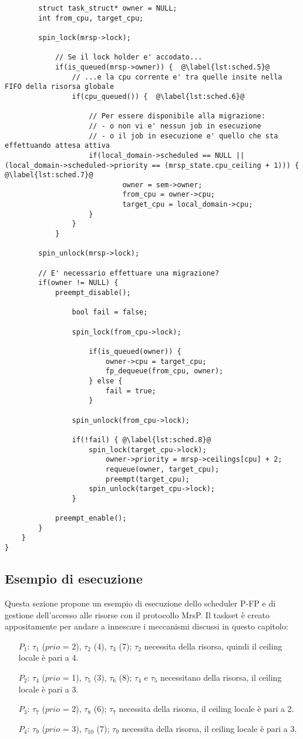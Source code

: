 \begin{lstlisting}
		struct task_struct* owner = NULL;
		int from_cpu, target_cpu;

		spin_lock(mrsp->lock);

			// Se il lock holder e' accodato...
			if(is_queued(mrsp->owner)) {  @\label{lst:sched.5}@
				// ...e la cpu corrente e' tra quelle insite nella FIFO della risorsa globale
				if(cpu_queued()) {  @\label{lst:sched.6}@

					// Per essere disponibile alla migrazione:
					// - o non vi e' nessun job in esecuzione
					// - o il job in esecuzione e' quello che sta effettuando attesa attiva
					if(local_domain->scheduled == NULL || (local_domain->scheduled->priority == (mrsp_state.cpu_ceiling + 1))) {  @\label{lst:sched.7}@
							owner = sem->owner;
							from_cpu = owner->cpu;
							target_cpu = local_domain->cpu;
					}
				} 
			}

		spin_unlock(mrsp->lock);

		// E' necessario effettuare una migrazione?
		if(owner != NULL) {
			preempt_disable();

				bool fail = false;

				spin_lock(from_cpu->lock);
				
					if(is_queued(owner)) {
						owner->cpu = target_cpu;
						fp_dequeue(from_cpu, owner);
					} else {
						fail = true;
					}
				
				spin_unlock(from_cpu->lock);

				if(!fail) { @\label{lst:sched.8}@
					spin_lock(target_cpu->lock);
						owner->priority = mrsp->ceilings[cpu] + 2;
						requeue(owner, target_cpu);
						preempt(target_cpu);
					spin_unlock(target_cpu->lock);
				}

			preempt_enable();
		}
	}
}
\end{lstlisting}

\subsection{Esempio di esecuzione}
\label{sec:mrsp_exe}

Questa sezione propone un esempio di esecuzione dello scheduler P-FP e di gestione dell'accesso alle risorse con il protocollo MrsP. Il taskset è creato appositamente per andare a innescare i meccanismi discussi in questo capitolo:

\begin{itemize}
	\item [$P_1$:] $\tau_1$ ($prio$ = 2), $\tau_2$ (4), $\tau_3$ (7); $\tau_2$ necessita della risorsa, quindi il ceiling locale è pari a 4.
	\item [$P_2$:] $\tau_4$ ($prio$ = 1), $\tau_5$ (3), $\tau_6$ (8); $\tau_4$ e $\tau_5$ necessitano della risorsa, il ceiling locale è pari a 3.
	\item [$P_3$:] $\tau_7$ ($prio$ = 2), $\tau_8$ (6); $\tau_7$ necessita della risorsa, il ceiling locale è pari a 2.
	\item [$P_4$:] $\tau_9$ ($prio$ = 3), $\tau_10$ (7); $\tau_9$ necessita della risorsa, il ceiling locale è pari a 3.
\end{itemize}

